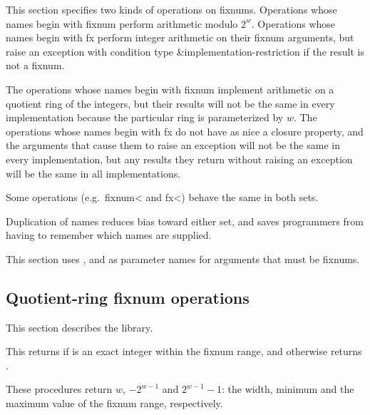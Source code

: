 This section specifies two kinds of operations on fixnums.  Operations
whose names begin with {\cf fixnum} perform arithmetic modulo
$2^{w}$.  Operations whose names begin with {\cf fx}
perform integer arithmetic on their fixnum arguments, but raise an
exception with condition type {\cf\&implementation-restriction} 
if the result is not a fixnum.

\begin{rationale}
The operations whose names begin with {\cf fixnum}
implement arithmetic on a quotient ring of the integers,
but their results will not be the same in every implementation
because the particular ring is parameterized by $w$.
The operations whose names begin with {\cf fx} do
not have as nice a closure property, and the arguments that
cause them to raise an exception will not be the same in every
implementation, but any results they return without
raising an exception will be the same in all implementations.
\end{rationale}

Some operations (e.g.\ {\cf fixnum<} and {\cf fx<}) behave the same in
both sets.

\begin{rationale}
Duplication of names reduces bias toward either set,
and saves programmers from having to remember which
names are supplied.
\end{rationale}

This section uses ,  and  as parameter
names for arguments that must be fixnums.

\subsection{Quotient-ring fixnum operations}

This section describes the  library.

\begin{entry}{%
}

This returns \schtrue{} if  is an exact
integer within the fixnum range, and
otherwise returns \schfalse{}.
\end{entry}

\begin{entry}{%
}

These procedures return $w$,
$-2^{w-1}$ and $2^{w-1} - 1$: the
width, minimum and the maximum value of the fixnum range, respectively.
\end{entry}

